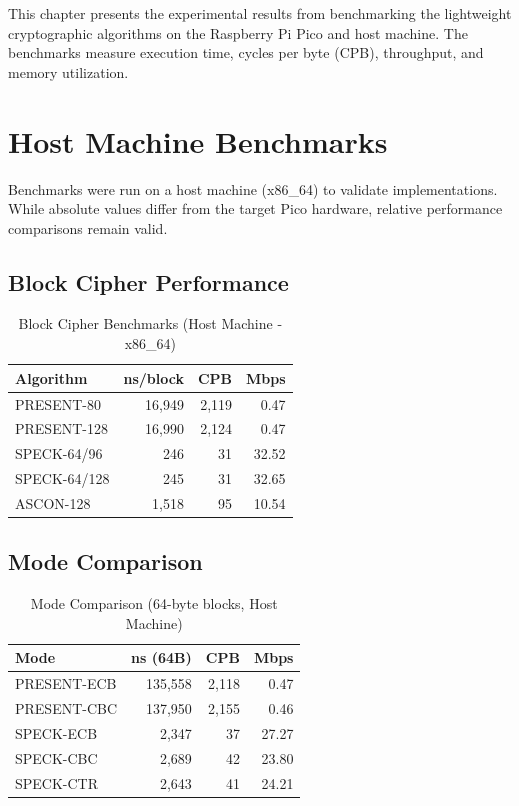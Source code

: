\documentclass[12pt]{report}
\begin{document}
This chapter presents the experimental results from benchmarking the lightweight cryptographic algorithms on the Raspberry Pi Pico and host machine. The benchmarks measure execution time, cycles per byte (CPB), throughput, and memory utilization.

\section{Host Machine Benchmarks}

Benchmarks were run on a host machine (x86\_64) to validate implementations. While absolute values differ from the target Pico hardware, relative performance comparisons remain valid.

\subsection{Block Cipher Performance}

\begin{table}[H]
    \centering
    \begin{tabular}{lrrr}
        \hline
        \textbf{Algorithm} & \textbf{ns/block} & \textbf{CPB} & \textbf{Mbps} \\
        \hline
        PRESENT-80 & 16,949 & 2,119 & 0.47 \\
        PRESENT-128 & 16,990 & 2,124 & 0.47 \\
        SPECK-64/96 & 246 & 31 & 32.52 \\
        SPECK-64/128 & 245 & 31 & 32.65 \\
        ASCON-128 & 1,518 & 95 & 10.54 \\
        \hline
    \end{tabular}
    \caption{Block Cipher Benchmarks (Host Machine - x86\_64)}
    \label{tab:block-bench}
\end{table}

\subsection{Mode Comparison}

\begin{table}[H]
    \centering
    \begin{tabular}{lrrr}
        \hline
        \textbf{Mode} & \textbf{ns (64B)} & \textbf{CPB} & \textbf{Mbps} \\
        \hline
        PRESENT-ECB & 135,558 & 2,118 & 0.47 \\
        PRESENT-CBC & 137,950 & 2,155 & 0.46 \\
        SPECK-ECB & 2,347 & 37 & 27.27 \\
        SPECK-CBC & 2,689 & 42 & 23.80 \\
        SPECK-CTR & 2,643 & 41 & 24.21 \\
        \hline
    \end{tabular}
    \caption{Mode Comparison (64-byte blocks, Host Machine)}
    \label{tab:mode-bench}
\end{table}
\end{document}
